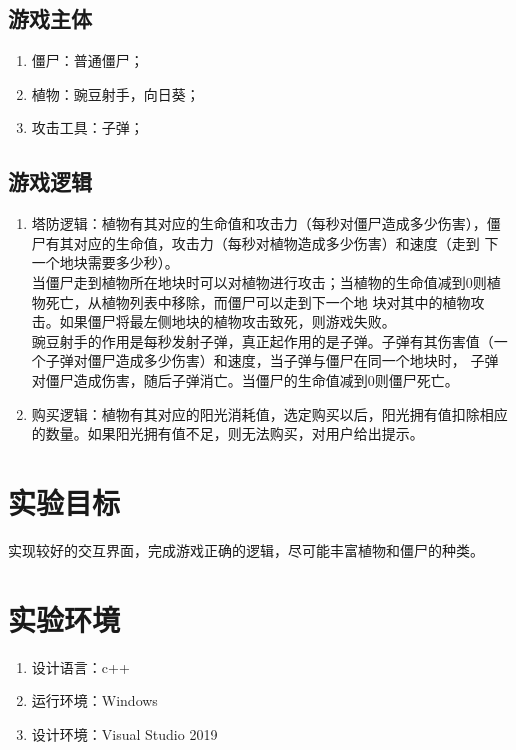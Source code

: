 \documentclass[12pt,a4paper,UTF8]{article}
\begin{document}
    \subsection{游戏主体}
        \begin{enumerate}
          \item 僵尸：普通僵尸；
          \item 植物：豌豆射手，向日葵；
          \item 攻击工具：子弹；
        \end{enumerate}

    \subsection{游戏逻辑}
        \begin{enumerate}
          \item 塔防逻辑：植物有其对应的生命值和攻击力（每秒对僵尸造成多少伤害），僵尸有其对应的生命值，攻击力（每秒对植物造成多少伤害）和速度（走到
          下一个地块需要多少秒）。\\
                当僵尸走到植物所在地块时可以对植物进行攻击；当植物的生命值减到0则植物死亡，从植物列表中移除，而僵尸可以走到下一个地
          块对其中的植物攻击。如果僵尸将最左侧地块的植物攻击致死，则游戏失败。\\
                豌豆射手的作用是每秒发射子弹，真正起作用的是子弹。子弹有其伤害值（一个子弹对僵尸造成多少伤害）和速度，当子弹与僵尸在同一个地块时，
          子弹对僵尸造成伤害，随后子弹消亡。当僵尸的生命值减到0则僵尸死亡。
          \item 购买逻辑：植物有其对应的阳光消耗值，选定购买以后，阳光拥有值扣除相应的数量。如果阳光拥有值不足，则无法购买，对用户给出提示。
          
        \end{enumerate}
    

\section{实验目标}
    实现较好的交互界面，完成游戏正确的逻辑，尽可能丰富植物和僵尸的种类。

\section{实验环境}
\begin{enumerate}
  \item 设计语言：c++
  \item 运行环境：Windows
  \item 设计环境：Visual Studio 2019
\end{enumerate}
  
\end{document}
